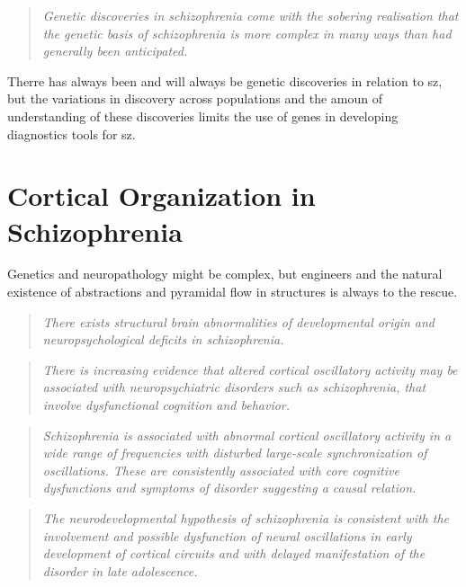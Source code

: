 \begin{quotation}
	\textit{Genetic discoveries in schizophrenia come with the sobering realisation that the genetic basis of schizophrenia is more complex in many ways than had generally been anticipated.}
	\begin{flushright}
		\cite{harrison2015recent}
	\end{flushright}
\end{quotation}
Therre has always been and will always be genetic discoveries in relation to \ac{sz}, but the variations in discovery across populations and the amoun of understanding of these discoveries limits the use of genes in developing diagnostics tools for \ac{sz}.

\section{Cortical Organization in Schizophrenia}\label{sec:corticals}
Genetics and neuropathology might be complex, but engineers and the natural existence of abstractions and pyramidal flow in structures is always to the rescue.
\begin{quotation}
	\textit{There exists structural  brain abnormalities of developmental origin and neuropsychological deficits in schizophrenia.}
	\begin{flushright}
		\cite{raggi2022auditory}
	\end{flushright}
\end{quotation}
\begin{quotation}
	\textit{There is increasing evidence that altered cortical oscillatory activity may be associated with neuropsychiatric disorders such as schizophrenia, that involve dysfunctional cognition and behavior.}
	\begin{flushright}
		\cite{uhlhaas2008role}
	\end{flushright}
\end{quotation}
\begin{quotation}
	\textit{Schizophrenia is associated with abnormal cortical oscillatory activity in a wide range of frequencies with disturbed large-scale synchronization of oscillations. These are consistently associated with core cognitive dysfunctions and symptoms of disorder suggesting a causal relation.}
	\begin{flushright}
		\cite{uhlhaas2008role}
	\end{flushright}
\end{quotation}
\begin{quotation}
	\textit{The neurodevelopmental hypothesis of schizophrenia is consistent with the involvement and possible dysfunction of neural oscillations in early development of cortical circuits and with delayed manifestation of the disorder in late adolescence.}
	\begin{flushright}
		\cite{uhlhaas2008role}
	\end{flushright}
\end{quotation}
